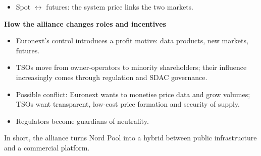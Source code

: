 \begin{aiout}
\begin{itemize}
  \item Spot $\leftrightarrow$ futures: the system price links the two markets.
\end{itemize}
\textbf{How the alliance changes roles and incentives}
\begin{itemize}
  \item Euronext's control introduces a profit motive: data products, new markets, futures.
  \item TSOs move from owner-operators to minority shareholders; their influence increasingly comes through regulation and SDAC governance.
  \item Possible conflict: Euronext wants to monetise price data and grow volumes; TSOs want transparent, low-cost price formation and security of supply.
  \item Regulators become guardians of neutrality.
\end{itemize}
In short, the alliance turns Nord Pool into a hybrid between public infrastructure and a commercial platform.
\end{aiout}

